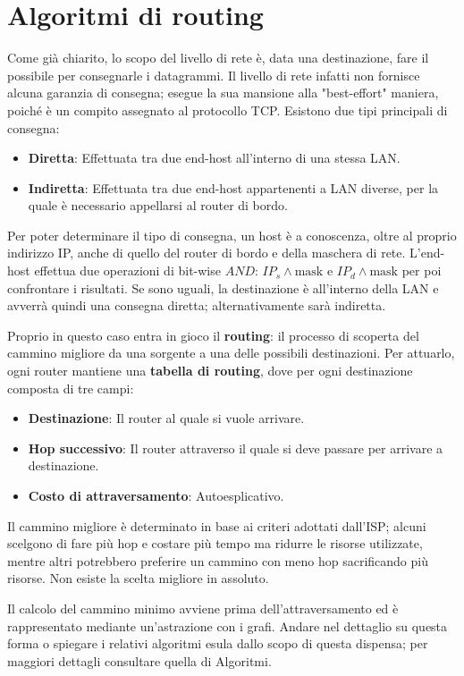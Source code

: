 %

\section{Algoritmi di routing}
Come già chiarito, lo scopo del livello di rete è, data una destinazione, fare il possibile per consegnarle i datagrammi. Il livello di rete infatti non
fornisce alcuna garanzia di consegna; esegue la sua mansione alla "best-effort" maniera, poiché è un compito assegnato al protocollo TCP. Esistono due
tipi principali di consegna: \begin{itemize}
	\item \textbf{Diretta}: Effettuata tra due end-host all'interno di una stessa LAN.
	\item \textbf{Indiretta}: Effettuata tra due end-host appartenenti a LAN diverse, per la quale è necessario appellarsi al router di bordo.
\end{itemize}

\noindent Per poter determinare il tipo di consegna, un host è a conoscenza, oltre al proprio indirizzo IP, anche di quello del router di bordo e della
maschera di rete. L'end-host effettua due operazioni di bit-wise $AND$: $IP_s \land \text{mask}$ e $IP_d \land \text{mask}$ per poi confrontare i
risultati. Se sono uguali, la destinazione è all'interno della LAN e avverrà quindi una consegna diretta; alternativamente sarà indiretta.\par
Proprio in questo caso entra in gioco il \textbf{routing}: il processo di scoperta del cammino migliore da una sorgente a una delle possibili
destinazioni. Per attuarlo, ogni router mantiene una \textbf{tabella di routing}, dove per ogni destinazione composta di tre campi: \begin{itemize}
	\item \textbf{Destinazione}: Il router al quale si vuole arrivare.
	\item \textbf{Hop successivo}: Il router attraverso il quale si deve passare per arrivare a destinazione.
	\item \textbf{Costo di attraversamento}: Autoesplicativo.
\end{itemize}

\noindent Il cammino migliore è determinato in base ai criteri adottati dall'ISP; alcuni scelgono di fare più hop e costare più tempo ma ridurre le
risorse utilizzate, mentre altri potrebbero preferire un cammino con meno hop sacrificando più risorse. Non esiste la scelta migliore in assoluto.\par
Il calcolo del cammino minimo avviene prima dell'attraversamento ed è rappresentato mediante un'astrazione con i grafi. Andare nel dettaglio su questa
forma o spiegare i relativi algoritmi esula dallo scopo di questa dispensa; per maggiori dettagli consultare quella di Algoritmi.\newline

